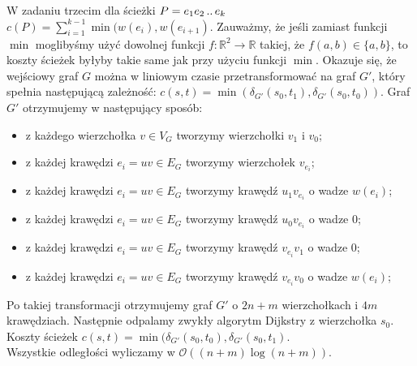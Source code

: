 \documentclass[11pt]{article}
\newcommand{\dd}{\mathinner{{\ldotp}{\ldotp}}}
\begin{document}
W zadaniu trzecim dla ścieżki $P=e_1e_2 \dd e_k$ $c(P) = \sum_{i=1}^{k-1} \min
(w(e_i), w(e_{i+1})$. Zauważmy, że jeśli zamiast funkcji $\min$ moglibyśmy użyć
dowolnej funkcji $f : \mathbb{R}^2 \rightarrow \mathbb{R}$ takiej, że $f(a,b)
\in \{a,b\}$, to koszty ścieżek byłyby takie same jak przy użyciu funkcji
$\min$. Okazuje się, że wejściowy graf $G$ można w liniowym czasie
przetransformować na graf $G'$, który spełnia następującą zależność: $c(s,t) =
\min(\delta_{G'}(s_0,t_1), \delta_{G'}(s_0,t_0))$. Graf $G'$ otrzymujemy w
następujący sposób:
\begin{itemize}
    \item z każdego wierzchołka $v \in V_G$ tworzymy wierzchołki $v_1$ i $v_0$;
    \item z każdej krawędzi $e_i=uv \in E_G$ tworzymy wierzchołek $v_{e_i}$;
    \item z każdej krawędzi $e_i = uv \in E_G$ tworzymy krawędź $u_1v_{e_i}$ o wadze $w(e_i)$;
    \item z każdej krawędzi $e_i = uv \in E_G$ tworzymy krawędź $u_0v_{e_i}$ o wadze $0$;
    \item z każdej krawędzi $e_i = uv \in E_G$ tworzymy krawędź $v_{e_i}v_1$ o wadze $0$;
    \item z każdej krawędzi $e_i = uv \in E_G$ tworzymy krawędź $v_{e_i}v_0$ o wadze $w(e_i)$;
\end{itemize}


Po takiej transformacji otrzymujemy graf $G'$ o $2n+m$ wierzchołkach i $4m$
krawędziach. Następnie odpalamy zwykły algorytm Dijkstry z wierzchołka $s_0$.\\
Koszty ścieżek $c(s,t)=\min(\delta_{G'}(s_0, t_0),\delta_{G'}(s_0, t_1)$.\\
Wszystkie odległości wyliczamy w $\mathcal{O}((n+m) \log (n+m))$.
\end{document}
